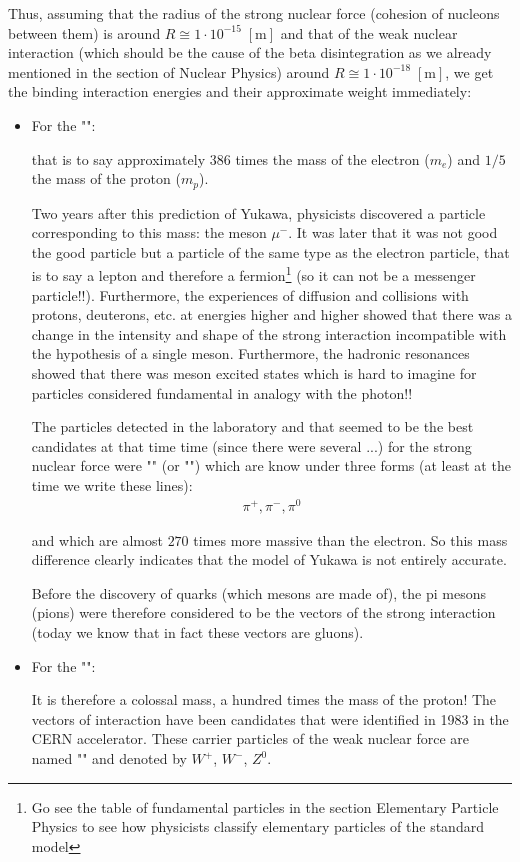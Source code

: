 	Thus, assuming that the radius of the strong nuclear force (cohesion of nucleons between them) is around $R\cong 1\cdot 10^{-15}\;[\text{m}]$ and that of the weak nuclear interaction (which should be the cause of the beta disintegration as we already mentioned in the section of Nuclear Physics) around $R\cong 1\cdot 10^{-18}\;[\text{m}]$, we get the binding interaction energies and their approximate weight immediately:
	\begin{itemize}
		\item For the "":
		
		that is to say approximately $386$ times the mass of the electron ($m_e$) and $1/5$ the mass of the proton ($m_p$).
	
		Two years after this prediction of Yukawa, physicists discovered a particle corresponding to this mass: the meson $\mu^{-}$. It was later that it was not good the good particle but a particle of the same type as the electron particle, that is to say a lepton and therefore a fermion\footnote{Go see the table of fundamental particles in the section Elementary Particle Physics to see how physicists classify elementary particles of the standard model} (so it can not be a messenger particle!!). Furthermore, the experiences of diffusion and collisions with protons, deuterons, etc. at energies higher and higher showed that there was a change in the intensity and shape of the strong interaction incompatible with the hypothesis of a single meson. Furthermore, the hadronic resonances showed that there was meson excited states which is hard to imagine for particles considered fundamental in analogy with the photon!!
	
		The particles detected in the laboratory and that seemed to be the best candidates at that time time (since there were several ...) for the strong nuclear force were "" (or "") which are know under three forms (at least at the time we write these lines):
		\begin{gather*}
			\pi^+,\pi^-,\pi^0
		\end{gather*}
		
		and which are almost $270$ times more massive than the electron. So this mass difference clearly indicates that the model of Yukawa is not entirely accurate.

		Before the discovery of quarks (which mesons are made of), the pi mesons (pions) were therefore considered to be the vectors of the strong interaction (today we know that in fact these vectors are gluons).
	
		\item For the "":
		
		It is therefore a colossal mass, a hundred times the mass of the proton! The vectors of interaction have been candidates that were identified in 1983 in the CERN accelerator. These carrier particles of the weak nuclear force are named "" and denoted by $W^+$, $W^-$, $Z^0$.
	\end{itemize}
